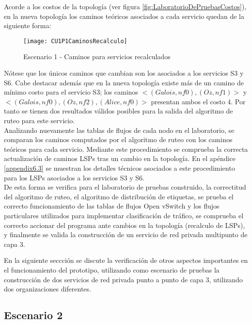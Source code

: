 Acorde a los costos de la topolog\'ia (ver figura \ref{fig:LaboratorioDePruebasCostos}), en la nueva topolog\'ia los caminos te\'oricos asociados a cada servicio quedan de la siguiente forma:

\begin{figure}[h] 
\centering    
\texttt{[image: CU1P1CaminosRecalculo]}
\caption[Escenario 1 - Caminos para servicios recalculados]{Escenario 1 - Caminos para servicios recalculados}
\label{fig:CUP1Caminos2}
\end{figure}
 
N\'otese que los \'unicos caminos que cambian son los asociados a los servicios S3 y S6. Cabe destacar adem\'as que en la nueva topolog\'ia existe m\'as de un camino de m\'inimo costo para el servicio S3; los caminos $<(Galois, nf0), (Oz, nf1)>$ y $<(Galois, nf0), (Oz, nf2), (Alice, nf0)>$ presentan ambos el costo 4. Por tanto se tienen dos resultados v\'alidos posibles para la salida del algoritmo de ruteo para este servicio.\\

Analizando nuevamente las tablas de flujos de cada nodo en el laboratorio, se comparan los caminos computados por el algoritmo de ruteo con los caminos te\'oricos para cada servicio. Mediante este procedimiento se comprueba la correcta actualizaci\'on de caminos LSPs tras un cambio en la topolog\'ia. En el ap\'endice \ref{appendix6.3} se muestran los detalles t\'ecnicos asociados a este procedimiento para los LSPs asociados a los servicios S3 y S6.\\ 
 
De esta forma se verifica para el laboratorio de pruebas construido, la correctitud del algoritmo de ruteo, el algoritmo de distribución de etiquetas, se prueba el correcto funcionamiento de las tablas de flujos Open vSwitch y los flujos particulares utilizados para implementar clasificación de tr\'afico, se comprueba el correcto accionar del programa ante cambios en la topolog\'ia (recalculo de LSPs), y finalmente se valida la construcción de un servicio de red privada multipunto de capa 3.

En la siguiente seccci\'on se discute la verificación de otros aspectos importantes en el funcionamiento del prototipo, utilizando como escenario de pruebas la construcci\'on de dos servicios de red privada punto a punto de capa 3, utilizando dos organizaciones diferentes.   

\subsection{Escenario 2}

